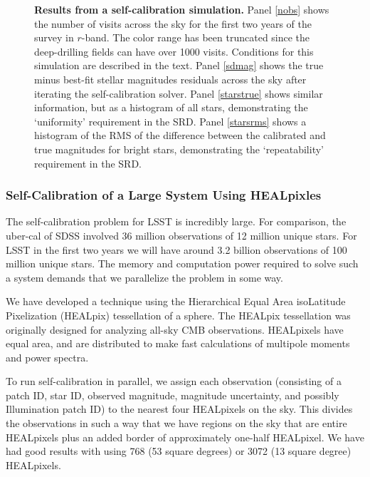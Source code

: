 \documentclass[12pt,preprint]{aastex}
\begin{document}
\begin{figure}
{\begin{minipage}{6.5in}
\caption{{\small {\bf Results from a self-calibration simulation.}
Panel \ref{nobs} shows the number of visits across the sky for the
first two years of the survey in $r$-band.  The color range has been
truncated since the deep-drilling fields can have over 1000 visits.
Conditions for this simulation are described in the text.  Panel
\ref{sdmag} shows the true minus best-fit stellar magnitudes residuals
across the sky after iterating the self-calibration solver. Panel
\ref{starstrue} shows similar information, but as a histogram of all
stars, demonstrating the `uniformity' requirement in the SRD. Panel
\ref{starsrms} shows a histogram of the RMS of the difference between
the calibrated and true magnitudes for bright stars, demonstrating the
`repeatability' requirement in the SRD.  }}
\label{fig:selfcal_fiducial}
\end{minipage}
}
\end{figure}


\subsubsection{Self-Calibration of a Large System Using HEALpixles}

The self-calibration problem for LSST is incredibly large.  For comparison, the uber-cal of SDSS involved 36 million observations of 12 million unique stars.  For LSST in the first two years we will have around 3.2 billion observations of 100 million unique stars.  The memory and computation power required to solve such a system demands that we parallelize the problem in some way.

We have developed a technique using the Hierarchical Equal Area isoLatitude Pixelization (HEALpix) tessellation of a sphere.  The HEALpix tessellation was originally designed for analyzing all-sky CMB observations.  HEALpixels have equal area, and are distributed to make fast calculations of multipole moments and power spectra.  

To run self-calibration in parallel, we assign each observation (consisting of a patch ID, star ID, observed magnitude, magnitude uncertainty, and possibly Illumination patch ID) to the nearest four HEALpixels on the sky.  This divides the observations in such a way that we have regions on the sky that are entire HEALpixels plus an added border of approximately one-half HEALpixel.  We have had good results with using 768 (53 square degrees) or 3072 (13 square degree) HEALpixels.  
\end{document}
